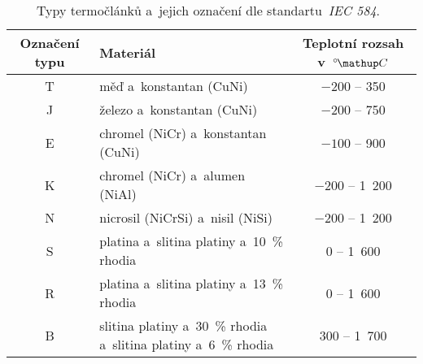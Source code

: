 \begin{table}[htbp]
    \centering
    \begin{tabular}{cm{7cm}c}
        \toprule
        Označení typu & Materiál & Teplotní rozsah v~$\C$\\
        \midrule
        T & měď a~konstantan (CuNi) & $-200$ -- 350\phantom{1 }\\
        J & železo a~konstantan (CuNi)& $-200$ -- 750\phantom{1 }\\
        E & chromel (NiCr) a~konstantan (CuNi) & $-100$ -- 900\phantom{1 }\\
        K & chromel (NiCr) a~alumen (NiAl) & $-200$ -- 1~200\\
        N & nicrosil (NiCrSi) a~nisil (NiSi) & $-200$ -- 1~200\\
        S & platina a~slitina platiny a~10~\% rhodia & \phantom{$-00$}0 -- 1~600\\
        R & platina a~slitina platiny a~13~\% rhodia & \phantom{$-00$}0 -- 1~600\\
        B & slitina platiny a~30~\% rhodia a~slitina platiny 
            a~6~\% rhodia & \phantom{$-$}300 -- 1~700\\
        \bottomrule
    \end{tabular}
    \caption{Typy termočlánků a~jejich označení dle 
    standartu~\emph{IEC 584}.~\cite{diplomka,iec584}}
    \label{tab:iec584}
\end{table}
